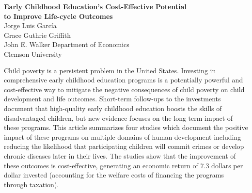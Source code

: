 



\newcommand*\leftright[2]{%
  \leavevmode
  \rlap{#1}%
  \hspace{0.5\linewidth}%
  #2}

\newcommand{\orth}{\ensuremath{\perp\!\!\!\perp}}%
\newcommand{\indep}{\orth}%
\newcommand{\notorth}{\ensuremath{\perp\!\!\!\!\!\!\diagup\!\!\!\!\!\!\perp}}%
\newcommand{\notindep}{\notorth}



\begin{center}

\singlespacing
\Large \textbf{Early Childhood Education’s Cost-Effective Potential \\ to Improve Life-cycle Outcomes}\\
\bigskip
{\large Jorge Luis Garc\'{i}a}\\
{\large Grace Guthrie Griffith}\\
{\large John E. Walker Department of Economics}\\
{\large Clemson University}

\end{center}
\thispagestyle{empty}

\doublespacing

\noindent Child poverty is a persistent problem in the United States. Investing in comprehensive early childhood education programs is a potentially powerful and cost-effective way to mitigate the negative consequences of child poverty on child development and life outcomes. Short-term follow-ups to the investments document that high-quality early childhood education boosts the skills of disadvantaged children, but new evidence focuses on the long term impact of these programs. This article summarizes four studies which document the positive impact of these programs on multiple domains of human development including reducing the likelihood that participating children will commit crimes or develop chronic diseases later in their lives. The studies show that the improvement of these outcomes is cost-effective, generating an economic return of 7.3 dollars per dollar invested (accounting for the welfare costs of financing the programs through taxation).\\


